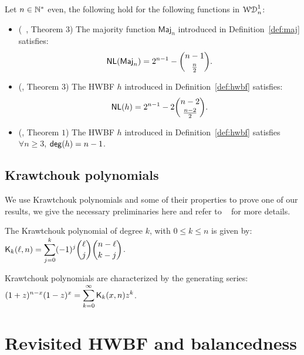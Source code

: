 \documentclass[11pt]{llncs}
\begin{document}
\begin{Prop}
	Let $n\in \mathbb{N}^*$ even, the following hold for the following functions in $\mathcal{WD}^{1}_{n}$: 
	\begin{itemize}
		\item (\eg ~\cite{DCC:DalMaiSar06}, Theorem $3$) The majority function $\textsf{Maj}_n$ introduced in Definition~\ref{def:maj} satisfies:
		\[
		\mathsf{NL}(\textsf{Maj}_n)=2^{n-1}-\binom{n-1}{\frac n2}.
		\]
		\item (\cite{DAM:WCST14}, Theorem $3$) The HWBF $h$ introduced in Definition~\ref{def:hwbf} satisfies:
		\[
		\mathsf{NL}(h)=2^{n-1}-2\binom{n-2}{\frac{n-2}{2}}.
		\]	
		\item (\cite{DAM:WCST14}, Theorem $1$) The HWBF $h$ introduced in Definition~\ref{def:hwbf} satisfies $\forall n \ge 3$, $\mathsf{deg}(h)=n-1$. 	
	\end{itemize}
\end{Prop}



\subsection{Krawtchouk polynomials}
We use Krawtchouk polynomials and some of their properties to prove one of our results, we give the necessary preliminaries here and refer to \eg ~\cite{book:MacSlo78} for more details.

\begin{definition}\label{def:Kraw}
	The Krawtchouk polynomial of degree $k$, with $0\leq k\leq n$ is given by: $ \displaystyle \mathsf{K}_{k}(\ell,n)=\sum_{j=0}^{k} (-1)^j \binom{\ell}{j} \binom{n-\ell}{k-j}$. 
	
	Krawtchouk polynomials are characterized by the generating series: $ \displaystyle (1+z)^{n-x} (1-z)^x=\sum_{k=0}^\infty \mathsf{K}_{k}(x,n) z^k$.
\end{definition}






\section{Revisited HWBF and balancedness}\label{sec:defAndBal}
\end{document}
